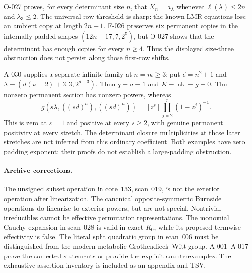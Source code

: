 \documentclass[11pt]{article}
\begin{document}
O-027 proves, for every determinant size \(n\), that
\(K_n=a_\lambda\) whenever \(\ell(\lambda)\leq2n\) and
\(\lambda_3\leq2\). The universal row threshold is sharp:
the known LMR equations lose an ambient copy at length \(2n+1\).
F-026 preserves six permanent copies in the internally padded shapes
\((12n-17,7,2^5)\), but O-027 shows that the determinant has
enough copies for every \(n\geq4\). Thus the displayed size-three
obstruction does not persist along those first-row shifts.

A-030 supplies a separate infinite family at \(n=m\geq3\): put
\(d=n^2+1\) and
\(\lambda=(d(n-2)+3,3,2^{d-3})\). Then \(q=a=1\) and
\(K=\operatorname{sk}=g=0\). The nonzero permanent section has
nonzero powers, whereas
\[
 g(s\lambda,((sd)^n),((sd)^n))
             =[z^s]\prod_{j=2}^n(1-z^j)^{-1}.
\]
This is zero at \(s=1\) and positive at every \(s\geq2\),
with genuine permanent positivity at every stretch. The determinant
closure multiplicities at those later stretches are not inferred
from this ordinary coefficient. Both examples have zero padding
exponent; their proofs do not establish a large-padding obstruction.

\paragraph{Archive corrections.}
The unsigned subset operation in cote~133, scan~019, is not the
exterior operation after linearization. The canonical opposite-symmetric
Burnside operations do linearize to exterior powers, but are not
special. Nontrivial irreducibles cannot be effective permutation
representations. The monomial Cauchy expansion in scan~028 is valid
in exact \(K_0\), while its proposed termwise effectivity is false.
The literal split quadratic group in scan~006 must be distinguished
from the modern metabolic Grothendieck--Witt group. A-001--A-017
prove the corrected statements or provide the explicit counterexamples.
The exhaustive assertion inventory is included as an appendix and TSV.
\end{document}
